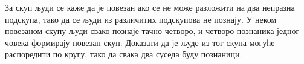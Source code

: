 За скуп људи се каже да је повезан ако се не може разложити на два непразна
подскупа, тако да се људи из различитих подскупова не познају.
У неком повезаном скупу људи свако познаје тачно четворо, и четворо познаника
једног човека формирају повезан скуп.
Доказати да је људе из тог скупа могуће распоредити по кругу, тако да свака два
суседа буду познаници.

\solution

